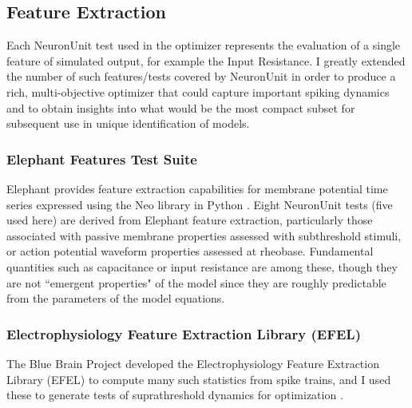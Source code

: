 \subsection{Feature Extraction}
Each NeuronUnit test used in the optimizer represents the evaluation of a single feature of simulated output, for example the Input Resistance.
I greatly extended the number of such features/tests covered by NeuronUnit in order to produce a rich, multi-objective optimizer that could capture important spiking dynamics and to obtain insights into what would be the most compact subset for subsequent use in unique identification of models.

\subsubsection{Elephant Features Test Suite}
\label{sec:elephant}
Elephant \citep{elephant18} provides feature extraction capabilities for membrane potential time series expressed using the Neo library in Python \citep{davison_neo}.
Eight NeuronUnit tests (five used here) are derived from Elephant feature extraction, particularly those associated with passive membrane properties assessed with subthreshold stimuli, or action potential waveform properties assessed at rheobase.
Fundamental quantities such as capacitance or input resistance are among these, though they are not ``emergent properties" of the model since they are roughly predictable from the parameters of the model equations.

\subsubsection{Electrophysiology Feature Extraction Library (EFEL)}
\label{sec:efel}
The Blue Brain Project developed the Electrophysiology Feature Extraction Library (EFEL) to compute many such statistics from spike trains, and I used these to generate tests of suprathreshold dynamics for optimization \citep{EFEL}.

